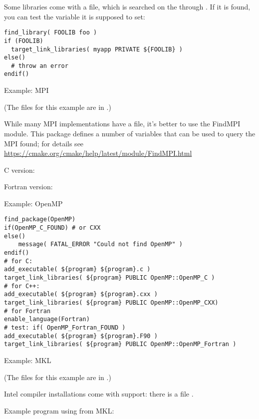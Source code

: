 Some libraries come with a  file,
which is searched on the 
through .
If it is found, you can test the variable it is supposed to set:
\begin{lstlisting}
find_library( FOOLIB foo )
if (FOOLIB)
  target_link_libraries( myapp PRIVATE ${FOOLIB} )
else()
  # throw an error
endif()
\end{lstlisting}

 {Example: MPI}

(The files for this example are in .)

While many MPI implementations have a  file,
it's better to use the FindMPI module.
This package defines a number of variables
that can be used to query the MPI found;
for details see \url{https://cmake.org/cmake/help/latest/module/FindMPI.html}

C version:
%


Fortran version:
%



 {Example: OpenMP}

\begin{lstlisting}
find_package(OpenMP)
if(OpenMP_C_FOUND) # or CXX
else()
	message( FATAL_ERROR "Could not find OpenMP" )
endif()
# for C:
add_executable( ${program} ${program}.c )
target_link_libraries( ${program} PUBLIC OpenMP::OpenMP_C )
# for C++:
add_executable( ${program} ${program}.cxx )
target_link_libraries( ${program} PUBLIC OpenMP::OpenMP_CXX)
# for Fortran
enable_language(Fortran)
# test: if( OpenMP_Fortran_FOUND )
add_executable( ${program} ${program}.F90 )
target_link_libraries( ${program} PUBLIC OpenMP::OpenMP_Fortran )
\end{lstlisting}


 {Example: MKL}

(The files for this example are in .)

Intel compiler installations come with  support:
there is a file .

Example program using  from MKL:


